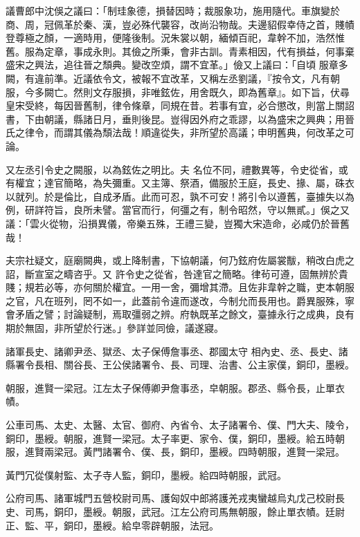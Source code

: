 \begin{pinyinscope}
 議曹郎中沈俁之議曰：「制珪象德，損替因時；裁服象功，施用隨代。車旗變於商、周，冠佩革於秦、漢，豈必殊代襲容，改尚沿物哉。夫邊貂假幸侍之首，賤幘登尊極之顏，一適時用，便隆後制。況朱裳以朝，緬傾百祀，韋幹不加，浩然惟舊。服為定章，事成永則。其儉之所秉，會非古訓。青素相因，代有損益，何事棄盛宋之興法，追往晉之頹典。變改空煩，謂不宜革。」儉又上議曰：「自頃
 服章多闕，有違前準。近議依令文，被報不宜改革，又稱左丞劉議，『按令文，凡有朝服，今多闕亡。然則文存服損，非唯鉉佐，用舍既久，即為舊章』。如下旨，伏尋皇宋受終，每因晉舊制，律令條章，同規在昔。若事有宜，必合懲改，則當上關詔書，下由朝議，縣諸日月，垂則後昆。豈得因外府之乖謬，以為盛宋之興典；用晉氏之律令，而謂其儀為頹法哉！順違從失，非所望於高議；申明舊典，何改革之可論。



 又左丞引令史之闕服，以為鉉佐之明比。夫
 名位不同，禮數異等，令史從省，或有權宜；達官簡略，為失彌重。又主簿、祭酒，備服於王庭，長史、掾、屬，硃衣以就列。於是倫比，自成矛盾。此而可忍，孰不可安！將引令以遵舊，臺據失以為例，研詳符旨，良所未譬。當官而行，何彊之有，制令昭然，守以無貳。」俁之又議：「雲火從物，沿損異儀，帝樂五殊，王禮三變，豈獨大宋造命，必咸仍於晉舊哉！



 夫宗社疑文，庭廟闕典，或上降制書，下協朝議，何乃鉉府佐屬裳黻，稍改白虎之詔，斷宣室之疇咨乎。又
 許令史之從省，咎達官之簡略。律茍可遵，固無辨於貴賤；規若必等，亦何關於權宜。一用一舍，彌增其滯。且佐非韋幹之職，吏本朝服之官，凡在班列，罔不如一，此蓋前令違而遂改，今制允而長用也。爵異服殊，寧會矛盾之譬；討論疑制，焉取彊弱之辨。府執既革之餘文，臺據永行之成典，良有期於無固，非所望於行迷。」參詳並同儉，議遂寢。



 諸軍長史、諸卿尹丞、獄丞、太子保傅詹事丞、郡國太守
 相內史、丞、長史、諸縣署令長相、關谷長、王公侯諸署令、長、司理、治書、公主家僕，銅印，墨綬。



 朝服，進賢一梁冠。江左太子保傅卿尹詹事丞，皁朝服。郡丞、縣令長，止單衣幘。



 公車司馬、太史、太醫、太官、御府、內省令、太子諸署令、僕、門大夫、陵令，銅印，墨綬。朝服，進賢一梁冠。太子率更、家令、僕，銅印，墨綬。給五時朝服，進賢兩梁冠。黃門諸署令、僕、長，銅印，墨綬。四時朝服，進賢一梁冠。



 黃門冗從僕射監、太子寺人監，銅印，墨綬。給四時朝服，武冠。



 公府司馬、諸軍城門五營校尉司馬、護匈奴中郎將護羌戎夷蠻越烏丸戊己校尉長史、司馬，銅印，墨綬。朝服，武冠。江左公府司馬無朝服，餘止單衣幘。廷尉正、監、平，銅印，墨綬。給皁零辟朝服，法冠。




\end{pinyinscope}
